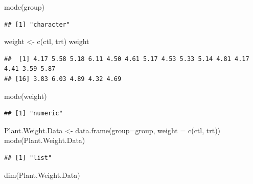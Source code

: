 \documentclass[
]{book}
\newenvironment{Shaded}{\begin{snugshade}}{\end{snugshade}}
\newcommand{\AttributeTok}[1]{\textcolor[rgb]{0.77,0.63,0.00}{#1}}
\newcommand{\FunctionTok}[1]{\textcolor[rgb]{0.00,0.00,0.00}{#1}}
\newcommand{\NormalTok}[1]{#1}
\newcommand{\OtherTok}[1]{\textcolor[rgb]{0.56,0.35,0.01}{#1}}
\begin{document}
\begin{Shaded}
\begin{Highlighting}[]
\FunctionTok{mode}\NormalTok{(group)}
\end{Highlighting}
\end{Shaded}

\begin{verbatim}
## [1] "character"
\end{verbatim}

\begin{Shaded}
\begin{Highlighting}[]
\NormalTok{weight }\OtherTok{\textless{}{-}} \FunctionTok{c}\NormalTok{(ctl, trt)}
\NormalTok{weight}
\end{Highlighting}
\end{Shaded}

\begin{verbatim}
##  [1] 4.17 5.58 5.18 6.11 4.50 4.61 5.17 4.53 5.33 5.14 4.81 4.17 4.41 3.59 5.87
## [16] 3.83 6.03 4.89 4.32 4.69
\end{verbatim}

\begin{Shaded}
\begin{Highlighting}[]
\FunctionTok{mode}\NormalTok{(weight)}
\end{Highlighting}
\end{Shaded}

\begin{verbatim}
## [1] "numeric"
\end{verbatim}

\begin{Shaded}
\begin{Highlighting}[]
\NormalTok{Plant.Weight.Data }\OtherTok{\textless{}{-}} \FunctionTok{data.frame}\NormalTok{(}\AttributeTok{group=}\NormalTok{group, }\AttributeTok{weight =} \FunctionTok{c}\NormalTok{(ctl, trt)) }
\FunctionTok{mode}\NormalTok{(Plant.Weight.Data)}
\end{Highlighting}
\end{Shaded}

\begin{verbatim}
## [1] "list"
\end{verbatim}

\begin{Shaded}
\begin{Highlighting}[]
\FunctionTok{dim}\NormalTok{(Plant.Weight.Data)}
\end{Highlighting}
\end{Shaded}
\end{document}
